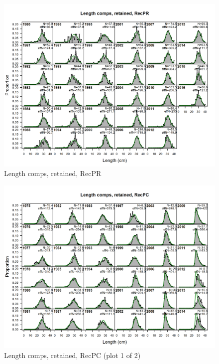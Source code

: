 \documentclass[12pt,]{article}
\begin{document}
\begin{figure}[htbp]
\centering
\includegraphics{./r4ss/plots_mod1/comp_lenfit_flt4mkt2.png}
\caption{Length comps, retained, RecPR
\label{fig:mod1_4_comp_lenfit_flt4mkt2}}
\end{figure}

\begin{figure}[htbp]
\centering
\includegraphics{./r4ss/plots_mod1/comp_lenfit_flt5mkt2_page1.png}
\caption{Length comps, retained, RecPC (plot 1 of 2)
\label{fig:mod1_5_comp_lenfit_flt5mkt2_page1}}
\end{figure}
\end{document}
